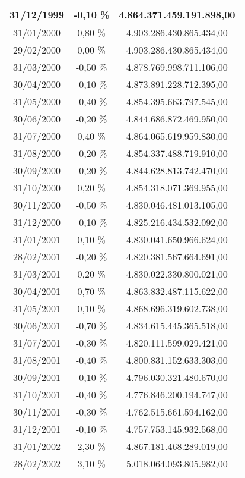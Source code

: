 \begin{center}
\begin{longtable}{|c|c|c|}
31/12/1999 & -0,10 \% & 4.864.371.459.191.898,00  \\ \hline
31/01/2000 & 0,80 \% & 4.903.286.430.865.434,00  \\ \hline
29/02/2000 & 0,00 \% & 4.903.286.430.865.434,00  \\ \hline
31/03/2000 & -0,50 \% & 4.878.769.998.711.106,00  \\ \hline
30/04/2000 & -0,10 \% & 4.873.891.228.712.395,00  \\ \hline
31/05/2000 & -0,40 \% & 4.854.395.663.797.545,00  \\ \hline
30/06/2000 & -0,20 \% & 4.844.686.872.469.950,00  \\ \hline
31/07/2000 & 0,40 \% & 4.864.065.619.959.830,00  \\ \hline
31/08/2000 & -0,20 \% & 4.854.337.488.719.910,00  \\ \hline
30/09/2000 & -0,20 \% & 4.844.628.813.742.470,00  \\ \hline
31/10/2000 & 0,20 \% & 4.854.318.071.369.955,00  \\ \hline
30/11/2000 & -0,50 \% & 4.830.046.481.013.105,00  \\ \hline
31/12/2000 & -0,10 \% & 4.825.216.434.532.092,00  \\ \hline
31/01/2001 & 0,10 \% & 4.830.041.650.966.624,00  \\ \hline
28/02/2001 & -0,20 \% & 4.820.381.567.664.691,00  \\ \hline
31/03/2001 & 0,20 \% & 4.830.022.330.800.021,00  \\ \hline
30/04/2001 & 0,70 \% & 4.863.832.487.115.622,00  \\ \hline
31/05/2001 & 0,10 \% & 4.868.696.319.602.738,00  \\ \hline
30/06/2001 & -0,70 \% & 4.834.615.445.365.518,00  \\ \hline
31/07/2001 & -0,30 \% & 4.820.111.599.029.421,00  \\ \hline
31/08/2001 & -0,40 \% & 4.800.831.152.633.303,00  \\ \hline
30/09/2001 & -0,10 \% & 4.796.030.321.480.670,00  \\ \hline
31/10/2001 & -0,40 \% & 4.776.846.200.194.747,00  \\ \hline
30/11/2001 & -0,30 \% & 4.762.515.661.594.162,00  \\ \hline
31/12/2001 & -0,10 \% & 4.757.753.145.932.568,00  \\ \hline
31/01/2002 & 2,30 \% & 4.867.181.468.289.019,00  \\ \hline
28/02/2002 & 3,10 \% & 5.018.064.093.805.982,00  \\ \hline

\end{longtable}
\end{center}
